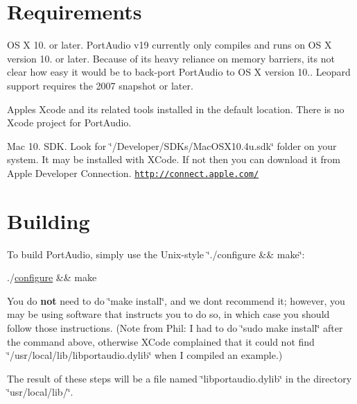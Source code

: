 \hypertarget{compile_mac_coreaudio_comp_mac_ca_1}{}\section{Requirements}\label{compile_mac_coreaudio_comp_mac_ca_1}
OS X 10. or later. Port\+Audio v19 currently only compiles and runs on OS X version 10. or later. Because of its heavy reliance on memory barriers, it\textquotesingle{}s not clear how easy it would be to back-\/port Port\+Audio to OS X version 10.. Leopard support requires the 2007 snapshot or later.

Apple\textquotesingle{}s Xcode and its related tools installed in the default location. There is no Xcode project for Port\+Audio.

Mac 10. S\+DK. Look for \char`\"{}/\+Developer/\+S\+D\+Ks/\+Mac\+O\+S\+X10.\+4u.\+sdk\char`\"{} folder on your system. It may be installed with X\+Code. If not then you can download it from Apple Developer Connection. \href{http://connect.apple.com/}{\tt http\+://connect.\+apple.\+com/}\hypertarget{compile_mac_coreaudio_comp_mac_ca_2}{}\section{Building}\label{compile_mac_coreaudio_comp_mac_ca_2}
To build Port\+Audio, simply use the Unix-\/style \char`\"{}./configure \&\& make\char`\"{}\+:


\begin{DoxyCode}
./\hyperlink{namespacewaflib_1_1extras_1_1autowaf_aed9c0237757b6bbcc7a442d726e82c47}{configure} && make
\end{DoxyCode}


You do {\bfseries not} need to do \char`\"{}make install\char`\"{}, and we don\textquotesingle{}t recommend it; however, you may be using software that instructs you to do so, in which case you should follow those instructions. (Note from Phil\+: I had to do \char`\"{}sudo make install\char`\"{} after the command above, otherwise X\+Code complained that it could not find \char`\"{}/usr/local/lib/libportaudio.\+dylib\char`\"{} when I compiled an example.)

The result of these steps will be a file named \char`\"{}libportaudio.\+dylib\char`\"{} in the directory \char`\"{}usr/local/lib/\char`\"{}.

